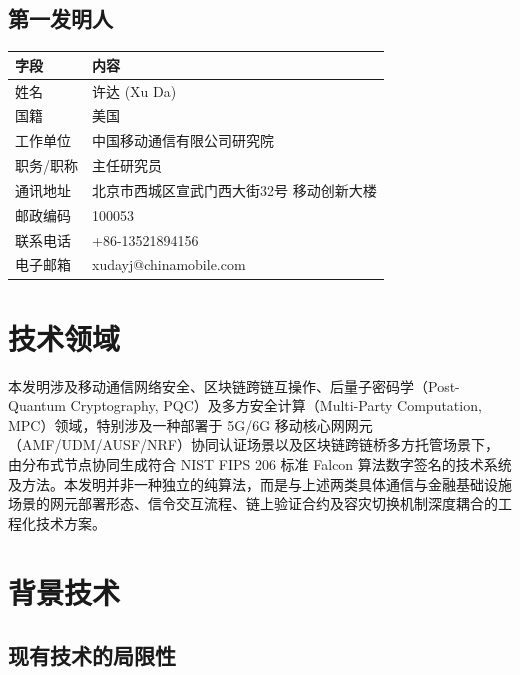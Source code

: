 \documentclass[12pt,a4paper]{article}
\begin{document}
\subsection{第一发明人}

\begin{table}[h]
\centering
\begin{tabular}{|p{4cm}|p{8cm}|}
\hline
\textbf{字段} & \textbf{内容} \\
\hline
姓名 & 许达 (Xu Da) \\
\hline
国籍 & 美国 \\
\hline
工作单位 & 中国移动通信有限公司研究院 \\
\hline
职务/职称 & 主任研究员 \\
\hline
通讯地址 & 北京市西城区宣武门西大街32号 移动创新大楼 \\
\hline
邮政编码 & 100053 \\
\hline
联系电话 & +86-13521894156 \\
\hline
电子邮箱 & xudayj@chinamobile.com \\
\hline
\end{tabular}
\end{table}

\section{技术领域}

本发明涉及移动通信网络安全、区块链跨链互操作、后量子密码学（Post-Quantum Cryptography, PQC）及多方安全计算（Multi-Party Computation, MPC）领域，特别涉及一种部署于 5G/6G 移动核心网网元（AMF/UDM/AUSF/NRF）协同认证场景以及区块链跨链桥多方托管场景下，由分布式节点协同生成符合 NIST FIPS 206 标准 Falcon 算法数字签名的技术系统及方法。本发明并非一种独立的纯算法，而是与上述两类具体通信与金融基础设施场景的网元部署形态、信令交互流程、链上验证合约及容灾切换机制深度耦合的工程化技术方案。

\section{背景技术}

\subsection{现有技术的局限性}
\end{document}
